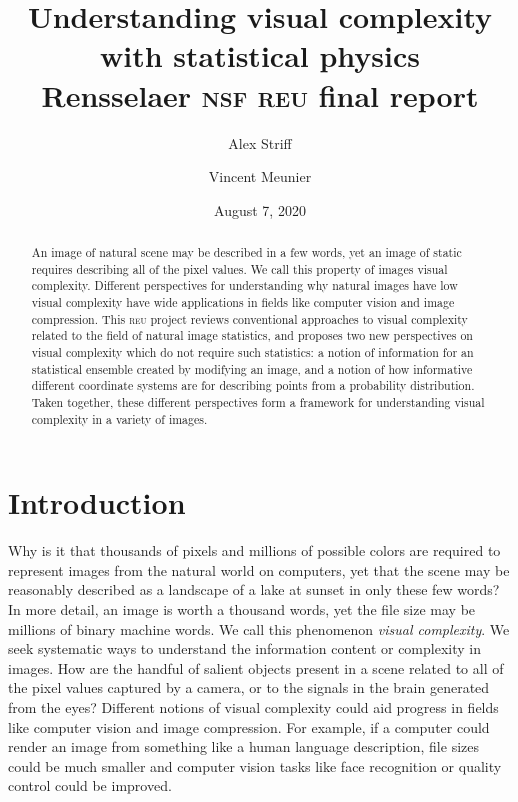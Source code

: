 \documentclass[aps,reprint,floatfix]{revtex4-2}
\theoremstyle{plain}
\theoremstyle{definition}
\begin{document}
\title{Understanding visual complexity with statistical physics\\
Rensselaer \textsc{nsf} \textsc{reu} final report}
\author{Alex Striff}
\author{Vincent Meunier}
\date{August 7, 2020}
\begin{abstract}
  An image of natural scene may be described in a few words, yet an image of
  static requires describing all of the pixel values. We call this property of
  images visual complexity. Different perspectives for understanding why natural
  images have low visual complexity have wide applications in fields like
  computer vision and image compression. This \textsc{reu} project reviews
  conventional approaches to visual complexity related to the field of natural
  image statistics, and proposes two new perspectives on visual complexity which
  do not require such statistics: a notion of information for an statistical
  ensemble created by modifying an image, and a notion of how informative
  different coordinate systems are for describing points from a probability
  distribution. Taken together, these different perspectives form a framework
  for understanding visual complexity in a variety of images.
\end{abstract}
\maketitle

{\small
\tableofcontents
}
\newpage

\section{Introduction}

Why is it that thousands of pixels and millions of possible colors are required
to represent images from the natural world on computers, yet that the scene may
be reasonably described as a landscape of a lake at sunset in only these few
words? In more detail, an image is worth a thousand words, yet the file size may
be millions of binary machine words. We call this phenomenon \emph{visual
complexity}. We seek systematic ways to understand the information content or
complexity in images. How are the handful of salient objects present in a scene
related to all of the pixel values captured by a camera, or to the signals in
the brain generated from the eyes? Different notions of visual complexity could
aid progress in fields like computer vision and image compression. For example,
if a computer could render an image from something like a human language
description, file sizes could be much smaller and computer vision tasks like
face recognition or quality control could be improved.
\end{document}

